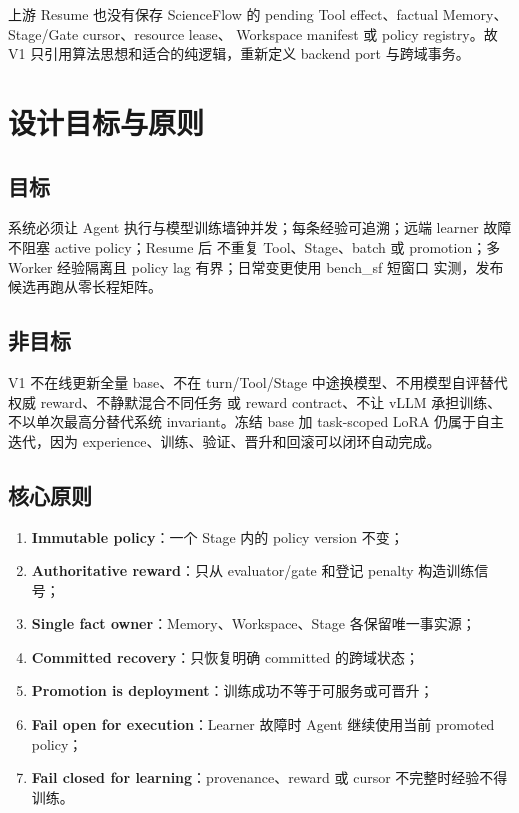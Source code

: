 \documentclass[UTF8,11pt,a4paper]{ctexart}
\begin{document}
上游 Resume 也没有保存 ScienceFlow 的 pending Tool effect、factual Memory、Stage/Gate cursor、resource lease、
Workspace manifest 或 policy registry。故 V1 只引用算法思想和适合的纯逻辑，重新定义 backend port 与跨域事务。

\section{设计目标与原则}

\subsection{目标}

系统必须让 Agent 执行与模型训练墙钟并发；每条经验可追溯；远端 learner 故障不阻塞 active policy；Resume 后
不重复 Tool、Stage、batch 或 promotion；多 Worker 经验隔离且 policy lag 有界；日常变更使用 bench\_sf 短窗口
实测，发布候选再跑从零长程矩阵。

\subsection{非目标}

V1 不在线更新全量 base、不在 turn/Tool/Stage 中途换模型、不用模型自评替代权威 reward、不静默混合不同任务
或 reward contract、不让 vLLM 承担训练、不以单次最高分替代系统 invariant。冻结 base 加 task-scoped LoRA
仍属于自主迭代，因为 experience、训练、验证、晋升和回滚可以闭环自动完成。

\subsection{核心原则}

\begin{enumerate}
  \item \textbf{Immutable policy}：一个 Stage 内的 policy version 不变；
  \item \textbf{Authoritative reward}：只从 evaluator/gate 和登记 penalty 构造训练信号；
  \item \textbf{Single fact owner}：Memory、Workspace、Stage 各保留唯一事实源；
  \item \textbf{Committed recovery}：只恢复明确 committed 的跨域状态；
  \item \textbf{Promotion is deployment}：训练成功不等于可服务或可晋升；
  \item \textbf{Fail open for execution}：Learner 故障时 Agent 继续使用当前 promoted policy；
  \item \textbf{Fail closed for learning}：provenance、reward 或 cursor 不完整时经验不得训练。
\end{enumerate}
\end{document}
